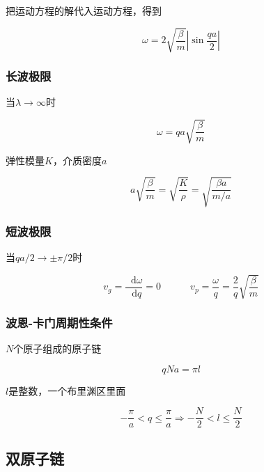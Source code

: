 \documentclass{article}
\newcommand*{\md}{\mathop{}\!\mathrm{d}}
\begin{document}
\begin{multicols}{2}
把运动方程的解代入运动方程，得到

\begin{equation*}
  \omega = 2 \sqrt{\frac{\beta}{m}} \left| \sin \frac{qa}{2} \right|  
\end{equation*}

\subsubsection{长波极限}

当$\lambda \rightarrow \infty$时

\begin{equation*}
  \omega = qa \sqrt{\frac{\beta}{m}} 
\end{equation*}

弹性模量$K$，介质密度$a$

\begin{equation*}
  a \sqrt{\frac{\beta}{m}} = \sqrt{\frac{K}{\rho}} = \sqrt{\frac{\beta a}{m/a}}  
\end{equation*}

\subsubsection{短波极限}

当$qa/2 \rightarrow \pm \pi /2$时

\begin{equation*}
  v_g = \frac{\md \omega}{\md q} = 0 \quad\quad\quad v_p = \frac{\omega}{q} = \frac{2}{q} \sqrt{\frac{\beta}{m}} 
\end{equation*}

\subsubsection{波恩-卡门周期性条件}

$N$个原子组成的原子链

\begin{equation*}
  qNa = \pi l
\end{equation*}

$l$是整数，一个布里渊区里面

\begin{equation*}
  - \frac{\pi}{a} < q \leq \frac{\pi}{a} \Rightarrow - \frac{N}{2} < l \leq \frac{N}{2}
\end{equation*}

\subsection{双原子链}


\end{multicols}
\end{document}
